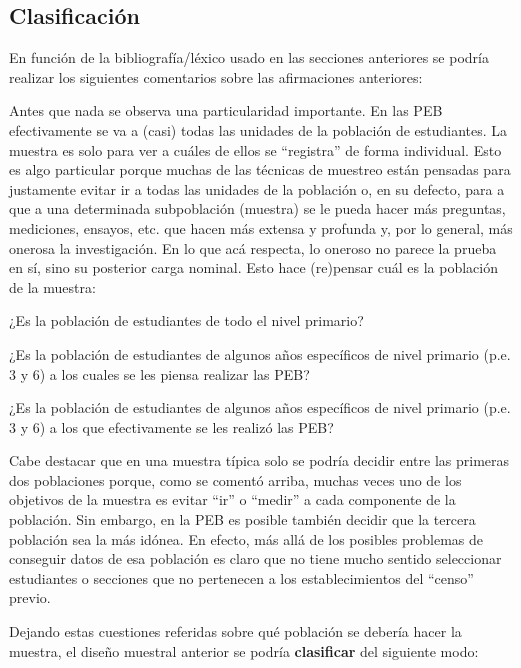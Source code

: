 \documentclass[
  spanish,
  a4paper,
]{scrreprt}
\begin{document}
\subsection{Clasificación}\label{clasificaciuxf3n}

En función de la bibliografía/léxico usado en las secciones anteriores
se podría realizar los siguientes comentarios sobre las afirmaciones
anteriores:

Antes que nada se observa una particularidad importante. En las PEB
efectivamente se va a (casi) todas las unidades de la población de
estudiantes. La muestra es solo para ver a cuáles de ellos se
``registra'' de forma individual. Esto es algo particular porque muchas
de las técnicas de muestreo están pensadas para justamente evitar ir a
todas las unidades de la población o, en su defecto, para a que a una
determinada subpoblación (muestra) se le pueda hacer más preguntas,
mediciones, ensayos, etc. que hacen más extensa y profunda y, por lo
general, más onerosa la investigación. En lo que acá respecta, lo
oneroso no parece la prueba en sí, sino su posterior carga nominal. Esto
hace (re)pensar cuál es la población de la muestra:

¿Es la población de estudiantes de todo el nivel primario?

¿Es la población de estudiantes de algunos años específicos de nivel
primario (p.e. 3 y 6) a los cuales se les piensa realizar las PEB?

¿Es la población de estudiantes de algunos años específicos de nivel
primario (p.e. 3 y 6) a los que efectivamente se les realizó las PEB?

Cabe destacar que en una muestra típica solo se podría decidir entre las
primeras dos poblaciones porque, como se comentó arriba, muchas veces
uno de los objetivos de la muestra es evitar ``ir'' o ``medir'' a cada
componente de la población. Sin embargo, en la PEB es posible también
decidir que la tercera población sea la más idónea. En efecto, más allá
de los posibles problemas de conseguir datos de esa población es claro
que no tiene mucho sentido seleccionar estudiantes o secciones que no
pertenecen a los establecimientos del ``censo'' previo.

Dejando estas cuestiones referidas sobre qué población se debería hacer
la muestra, el diseño muestral anterior se podría \textbf{clasificar}
del siguiente modo:
\end{document}

